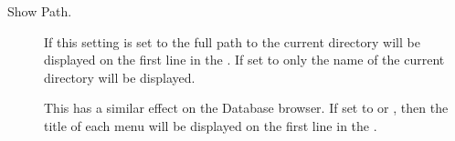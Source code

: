 \begin{description}
\item[Show Path.]
  If this setting is set to  the full path to the current
  directory will be displayed on the first line in the .
  If set to  only the name of the current
  directory will be displayed.
  
  This has a similar effect on the Database browser. If set to
   or , then the title of
  each menu will be displayed on the first line in the .

\end{description}
